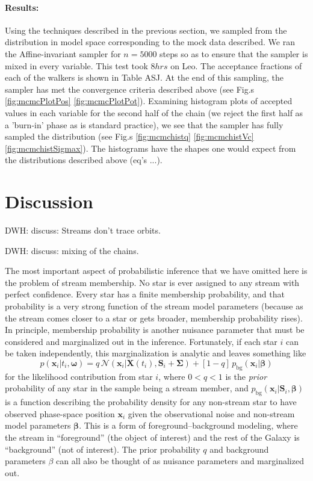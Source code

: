 \documentclass[12pt,preprint]{aastex}
\newcommand{\mtensor}[1]{\boldsymbol{#1}}
\newcommand{\mS}{\mtensor{S}}
\newcommand{\mSigma}{\mtensor{\Sigma}}
\newcommand{\mvector}[1]{\mtensor{#1}}
\newcommand{\vx}{\mvector{x}}
\newcommand{\vX}{\mvector{X}}
\newcommand{\vbeta}{\mvector{\beta}}
\newcommand{\vomega}{\mvector{\omega}}
\newcommand{\normal}{\mathscr{N}}
\newcommand{\pbg}{p_{\mathrm{bg}}}
\begin{document}
\paragraph{Results:}
Using the techniques described in the previous section, we sampled from the distribution in model space 
corresponding to the mock data described. We ran the Affine-invariant sampler for $n = 5000$ steps so 
as to ensure that the sampler is mixed in every variable. This test took $8 hrs$ on Leo. The acceptance 
fractions of each of the walkers is shown in Table ASJ. At the end of this sampling,  the sampler has met 
the convergence criteria described above (see Fig.s \eqref{fig:mcmcPlotPos} \eqref{fig:mcmcPlotPot}). 
Examining histogram plots of accepted values in each variable for the second half of the chain (we reject 
the first half as a 'burn-in' phase as is standard practice), we see that the sampler has fully sampled the 
distribution (see Fig.s \eqref{fig:mcmchistq} \eqref{fig:mcmchistVc} \eqref{fig:mcmchistSigmax}). The 
histograms have the shapes one would expect from the distributions described above (eq's ...). 

\section{Discussion}

DWH: discuss: Streams don't trace orbits.

DWH: discuss: mixing of the chains.

The most important aspect of probabilistic inference that we have
omitted here is the problem of stream membership.  No star is ever
assigned to any stream with perfect confidence.  Every star has a
finite membership probability, and that probability is a very strong
function of the stream model parameters (because as the stream comes
closer to a star or gets broader, membership probability rises).  In
principle, membership probability is another nuisance parameter that
must be considered and marginalized out in the inference.
Fortunately, if each star $i$ can be taken independently, this
marginalization is analytic and leaves something like
\begin{equation}
p(\vx_i|t_i,\vomega) = q\,\normal(\vx_i|\vX(t_i),\mS_i+\mSigma)
  +[1-q]\,\pbg(\vx_i|\vbeta)
\end{equation}
for the likelihood contribution from star $i$, where $0<q<1$ is the
\emph{prior} probability of any star in the sample being a stream
member, and $\pbg(\vx_i|\mS_i,\vbeta)$ is a function describing the
probability density for any non-stream star to have observed
phase-space position $\vx_i$ given the observational noise and
non-stream model parameters $\vbeta$.  This is a form of
foreground--background modeling, where the stream in ``foreground''
(the object of interest) and the rest of the Galaxy is ``background''
(not of interest).  The prior probability $q$ and background
parameters $\beta$ can all also be thought of as nuisance parameters
and marginalized out.
\end{document}
